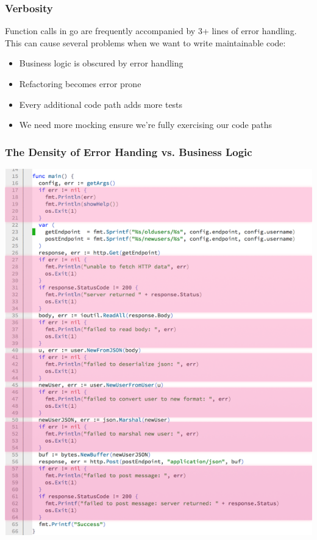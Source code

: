 \documentclass{beamer}
\begin{document}
\begin{frame}
  \frametitle{Verbosity}
  Function calls in go are frequently accompanied by 3+ lines of error
  handling. This can cause several problems when we want to write
  maintainable code:
  \par\pause
  \begin{itemize}
  \item Business logic is obscured by error handling
    \pause
  \item Refactoring becomes error prone
    \pause
  \item Every additional code path adds more tests
    \pause
  \item We need more mocking ensure we're fully exercising our code paths
  \end{itemize}
\end{frame}

\begin{frame}
  \frametitle{The Density of Error Handing vs. Business Logic}
  \begin{center}
    \includegraphics[height=.85\paperheight]{images/small/current_errors_highlighted}
  \end{center}
\end{frame}
\end{document}
